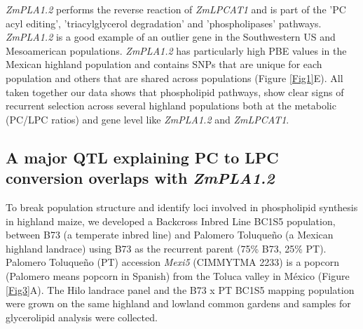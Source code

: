 \documentclass[9pt,twocolumn,twoside,lineno]{BioRxiv}
\begin{document}
\textit{ZmPLA1.2} performs the reverse reaction of \textit{ZmLPCAT1} and is part of the 'PC acyl editing', 'triacylglycerol degradation' and 'phospholipases' pathways. 
\textit{ZmPLA1.2} is a good example of an outlier gene in the Southwestern US and Mesoamerican populations.
\textit{ZmPLA1.2} has particularly high PBE values in the Mexican highland population and contains SNPs that are unique for each population and others that are shared across populations (Figure \ref{Fig1}E). 
All taken together our data shows that phospholipid pathways, show clear signs of recurrent selection across several highland populations both at the metabolic (PC/LPC ratios) and gene level like \textit{ZmPLA1.2} and \textit{ZmLPCAT1}.   

\subsection{A major QTL explaining PC to LPC conversion overlaps with \textit{ZmPLA1.2}} 
To break population structure and identify loci involved in phospholipid synthesis in highland maize, we developed a Backcross Inbred  Line BC1S5 population, between B73 (a temperate inbred line) and Palomero Toluqueño (a Mexican highland landrace) using B73 as the recurrent parent (75\% B73, 25\% PT). 
Palomero Toluqueño (PT) accession \textit{Mexi5} (CIMMYTMA 2233) is a popcorn (Palomero means popcorn in Spanish) from the Toluca valley in México (Figure \ref{Fig3}A). 
The Hilo landrace panel and the B73 x PT BC1S5 mapping population were grown on the same highland and lowland common gardens and samples for glycerolipid analysis were collected.
\end{document}
